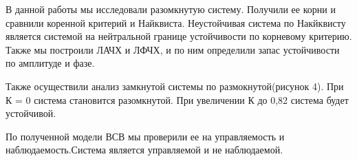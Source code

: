 \documentclass[a4paper, 12pt]{article}
\begin{document}
В данной работы мы исследовали разомкнутую систему. Получили ее корни и сравнили коренной критерий и Найквиста. Неустойчивая система по Накйквисту является системой на нейтральной границе устойчивости по корневому критерию. Также мы построили ЛАЧХ и ЛФЧХ, и по ним определили запас устойчивости по амплитуде и фазе. \par
Также осуществили анализ замкнутой системы по размокнутой(рисунок 4). При К = 0 система становится разомкнутой. При увеличении К до 0,82 система будет устойчивой. \par

По полученной модели ВСВ мы проверили ее на управляемость и наблюдаемость.Система является управляемой и не наблюдаемой.
\end{document}
